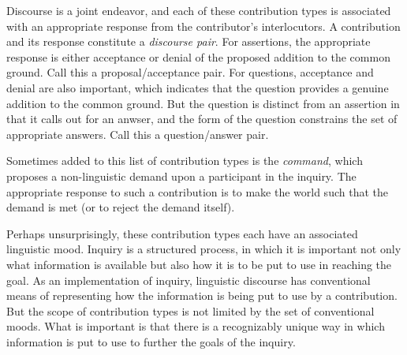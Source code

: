 \documentclass[letterpaper,]{article}
\begin{document}
Discourse is a joint endeavor, and each of these contribution types is
associated with an appropriate response from the contributor's
interlocutors. A contribution and its response constitute a
\emph{discourse pair}. For assertions, the appropriate response is
either acceptance or denial of the proposed addition to the common
ground. Call this a proposal/acceptance pair. For questions, acceptance
and denial are also important, which indicates that the question
provides a genuine addition to the common ground. But the question is
distinct from an assertion in that it calls out for an anwser, and the
form of the question constrains the set of appropriate answers. Call
this a question/answer pair.

Sometimes added to this list of contribution types is the
\emph{command}, which proposes a non-linguistic demand upon a
participant in the inquiry. The appropriate response to such a
contribution is to make the world such that the demand is met (or to
reject the demand itself).

Perhaps unsurprisingly, these contribution types each have an associated
linguistic mood. Inquiry is a structured process, in which it is
important not only what information is available but also how it is to
be put to use in reaching the goal. As an implementation of inquiry,
linguistic discourse has conventional means of representing how the
information is being put to use by a contribution. But the scope of
contribution types is not limited by the set of conventional moods. What
is important is that there is a recognizably unique way in which
information is put to use to further the goals of the inquiry.
\end{document}
